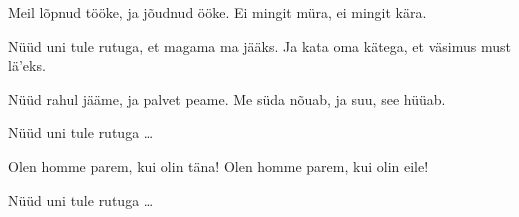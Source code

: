 Meil l\~opnud t\"o\"oke,
ja j\~oudnud \"o\"oke.
Ei mingit m\"ura,
ei mingit k\"ara.

N\"u\"ud uni tule rutuga,
et magama ma j\"a\"aks.
Ja kata oma k\"atega,
et v\"asimus must l\"a'eks.

N\"u\"ud rahul j\"a\"ame,
ja palvet peame.
Me s\"uda n\~ouab,
ja suu, see h\"u\"uab.

N\"u\"ud uni tule rutuga \ldots

Olen homme parem,
kui olin t\"ana!
Olen homme parem,
kui olin eile!

N\"u\"ud uni tule rutuga \ldots